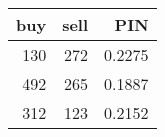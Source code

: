 \begin{tabular}{rrr}
\toprule
 buy &  sell &    PIN \\
\midrule
 130 &   272 & 0.2275 \\
 492 &   265 & 0.1887 \\
 312 &   123 & 0.2152 \\
\bottomrule
\end{tabular}

